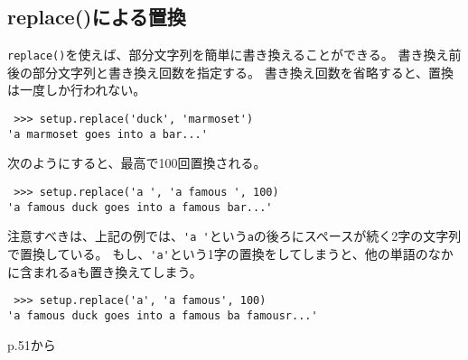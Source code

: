 \documentclass[11pt, oneside]{article}   	%
\begin{document}
 \subsection{replace()による置換}
\verb|replace()|を使えば、部分文字列を簡単に書き換えることができる。
書き換え前後の部分文字列と書き換え回数を指定する。
書き換え回数を省略すると、置換は一度しか行われない。
 \begin{lstlisting}
 >>> setup.replace('duck', 'marmoset')
'a marmoset goes into a bar...'
\end{lstlisting}
次のようにすると、最高で100回置換される。
 \begin{lstlisting}
 >>> setup.replace('a ', 'a famous ', 100)
'a famous duck goes into a famous bar...'
\end{lstlisting}
注意すべきは、上記の例では、\verb|'a '|という\verb|a|の後ろにスペースが続く2字の文字列で置換している。
もし、\verb|'a'|という1字の置換をしてしまうと、他の単語のなかに含まれる\verb|a|も置き換えてしまう。
\begin{lstlisting}
 >>> setup.replace('a', 'a famous', 100)
'a famous duck goes into a famous ba famousr...'
\end{lstlisting}

p.51から
 
\end{document}
